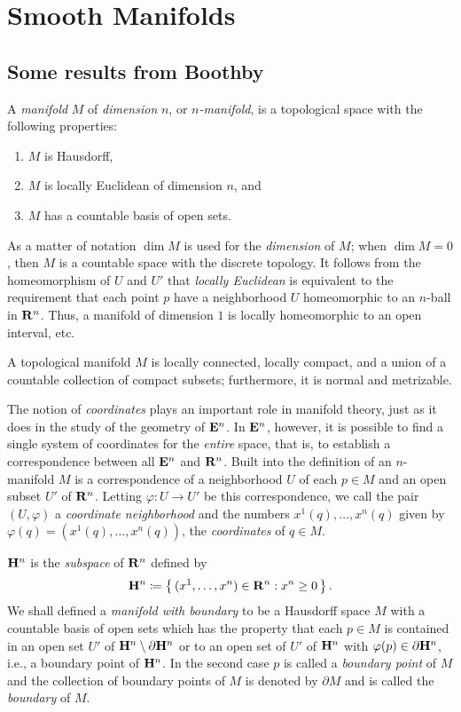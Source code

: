 \chapter{Smooth Manifolds}
\section{Some results from Boothby}
\begin{definition}[3.1]
A \emph{manifold} $M$ of \emph{dimension} $n$, or \emph{$n$-manifold}, is a
topological space with the following properties:
\begin{enumerate}[label=(\roman*)]
\item $M$ is Hausdorff,
\item $M$ is locally Euclidean of dimension $n$, and
\item $M$ has a countable basis of open sets.
\end{enumerate}
\end{definition}

As a matter of notation $\dim M$ is used for the \emph{dimension} of $M$;
when $\dim M=0$, then $M$ is a countable space with the discrete
topology. It follows from the homeomorphism of $U$ and $U'$ that
\emph{locally Euclidean} is equivalent to the requirement that each point
$p$ have a neighborhood $U$ homeomorphic to an $n$-ball in $\mathbf{R}^n$. Thus,
a manifold of dimension $1$ is locally homeomorphic to an open interval,
etc.

\begin{theorem}[3.6]
A topological manifold $M$ is locally connected, locally compact, and a
union of a countable collection of compact subsets; furthermore, it is
normal and metrizable.
\end{theorem}

The notion of \emph{coordinates} plays an important role in manifold
theory, just as it does in the study of the geometry of $\mathbf{E}^n$. In
$\mathbf{E}^n$, however, it is possible to find a single system of coordinates
for the \emph{entire} space, that is, to establish a correspondence between
all $\mathbf{E}^n$ and $\mathbf{R}^n$. Built into the definition of an $n$-manifold $M$
is a correspondence of a neighborhood $U$ of each $p\in M$ and an open
subset $U'$ of $\mathbf{R}^n$. Letting $\varphi\colon U\to U'$ be this
correspondence, we call the pair $(U,\varphi)$ a \emph{coordinate
  neighborhood} and the numbers $x^1(q),\dotsc,x^n(q)$ given by
$\varphi(q)=(x^1(q),\dotsc,x^n(q))$, the \emph{coordinates} of $q\in M$.

$\mathbf{H}^n$ is the \emph{subspace} of $\mathbf{R}^n$ defined by
\[
\mathbf{H}^n\coloneqq\left\{\,(x^1,\dotsc,x^n)\in\mathbf{R}^n:x^n\geq 0\,\right\}.
\]
We shall defined a \emph{manifold with boundary} to be a Hausdorff space
$M$ with a countable basis of open sets which has the property that each
$p\in M$ is contained in an open set $U'$ of $\mathbf{H}^n\setminus\partial\mathbf{H}^n$
or to an open set of $U'$ of $\mathbf{H}^n$ with $\varphi(p)\in\partial\mathbf{H}^n$,
i.e., a boundary point of $\mathbf{H}^n$. In the second case $p$ is called a
\emph{boundary point} of $M$ and the collection of boundary points of $M$
is denoted by $\partial M$ and is called the \emph{boundary} of $M$.

